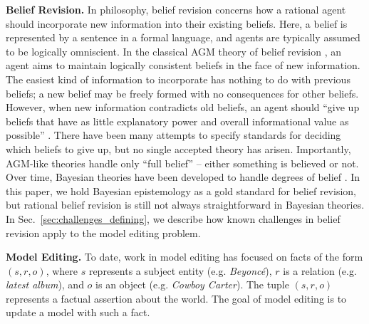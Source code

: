 \documentclass[11pt,a4paper]{article}
\newcommand{\beyonce}{Beyonc\'{e}\xspace}
\begin{document}
\noindent \textbf{Belief Revision.} In philosophy, belief revision concerns how a rational agent should incorporate new information into their existing beliefs. 
Here, a belief is represented by a sentence in a formal language, and agents are typically assumed to be logically omniscient. In the classical AGM theory of belief revision \citep{alchourron1985logic}, an agent aims to maintain logically consistent beliefs in the face of new information. 
The easiest kind of information to incorporate has nothing to do with previous beliefs; a new belief may be freely formed with no consequences for other beliefs.
However, when new information contradicts old beliefs, an agent should ``give up beliefs that have as little explanatory power and overall informational value as possible'' \citep{sep-logic-belief-revision}. 
There have been many attempts to specify standards for deciding which beliefs to give up, but no single accepted theory has arisen.
Importantly, AGM-like theories handle only ``full belief'' -- either something is believed or not. Over time, Bayesian theories have been developed to handle degrees of belief \citep{sep-epistemology-bayesian}. In this paper, we hold Bayesian epistemology as a gold standard for belief revision, but rational belief revision is still not always straightforward in Bayesian theories. In Sec.~\ref{sec:challenges_defining}, we describe how known challenges in belief revision apply to the model editing problem.

\vspace{6pt}
\noindent \textbf{Model Editing.} 
To date, work in model editing has focused on facts of the form $(s, r, o)$, where $s$ represents a subject entity (e.g. \textit{\beyonce}), $r$ is a relation (e.g. \textit{latest album}), and $o$ is an object (e.g. \textit{Cowboy Carter}). The tuple $(s,r,o)$ represents a factual assertion about the world. The goal of model editing is to update a model with such a fact.
\end{document}
